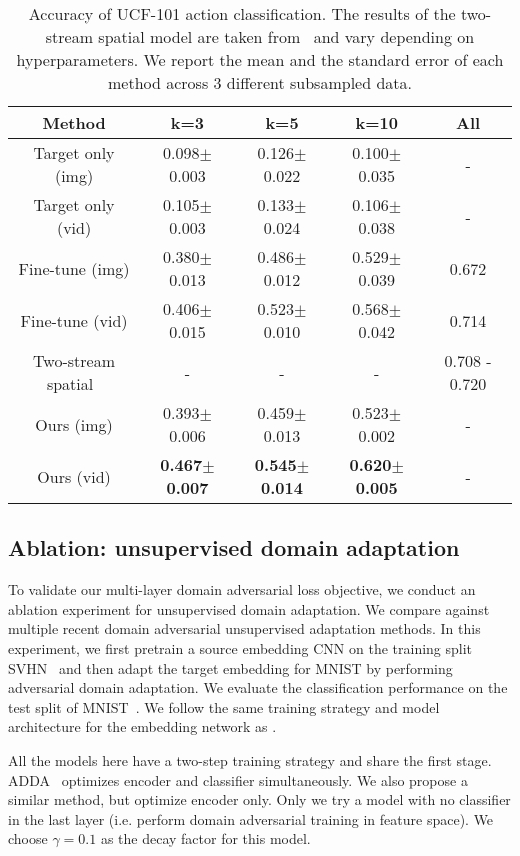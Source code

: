 \begin{table}[htbp]
\centering
\caption{Accuracy of UCF-101 action classification. The results of the two-stream spatial model are taken from~\cite{simonyan2014two} and vary depending on hyperparameters. We report the mean and the standard error of each method across 3 different subsampled data.}
\begin{tabular}{|c|c|c|c|c|}
\hline
\textbf{Method} & \textbf{k=3} & \textbf{k=5} & \textbf{k=10} & \textbf{All}\\
\hline
\hline
\hline
Target only (img) & 0.098$\pm$0.003 & 0.126$\pm$0.022 & 0.100$\pm$0.035 & -\\
Target only (vid) & 0.105$\pm$0.003 & 0.133$\pm$0.024 & 0.106$\pm$0.038 & -\\
\hline
Fine-tune (img) & 0.380$\pm$0.013 & 0.486$\pm$0.012 & 0.529$\pm$0.039 & 0.672\\
Fine-tune (vid) & 0.406$\pm$0.015 & 0.523$\pm$0.010 & 0.568$\pm$0.042 & 0.714\\
\hline
\hline
Two-stream spatial~\cite{simonyan2014two} & - & - & - & 0.708 - 0.720\\
\hline
\hline
Ours (img) & 0.393$\pm$0.006 & 0.459$\pm$0.013 & 0.523$\pm$0.002 & -\\
Ours (vid) & \textbf{0.467$\pm$0.007} & \textbf{0.545$\pm$0.014} & \textbf{0.620$\pm$0.005} & -\\
\hline
\end{tabular}

\label{ucf101}
\end{table}


\subsection{Ablation: unsupervised domain adaptation}

To validate our multi-layer domain adversarial loss objective, we conduct an ablation experiment for unsupervised domain adaptation. We compare against multiple recent domain adversarial unsupervised adaptation methods.
In this experiment, we first pretrain a source embedding CNN on the training split SVHN~\cite{netzer2011reading} and then adapt the target embedding for MNIST by performing adversarial domain adaptation. We evaluate the classification performance on the test split of MNIST~\cite{lecun1998gradient}. We follow the same training strategy and model architecture for the embedding network as \cite{tzeng2017adversarial}.

All the models here have a two-step training strategy and share the first stage. ADDA~\cite{tzeng2017adversarial} optimizes encoder and classifier simultaneously. We also propose a similar method, but optimize encoder only. Only we try a model with no classifier in the last layer (i.e. perform domain adversarial training in feature space). We choose $\gamma=0.1$ as the decay factor for this model.

